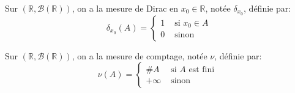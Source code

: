 \begin{example}
	Sur $(\mathbb{R}, \mathscr{B}(\mathbb{R}))$, on a la mesure de
	Dirac en $x_0 \in \mathbb{R}$, notée $\delta_{x_0}$, définie par:
	\begin{equation*}
		\delta_{x_0}(A) = \left\{
		\begin{array}{ll}
			1 & \text{ si } x_0 \in A \\
			0 & \text{ sinon }
		\end{array}
		\right.
	\end{equation*}
\end{example}

\begin{example}
	Sur $(\mathbb{R}, \mathscr{B}(\mathbb{R}))$, on a la mesure de comptage, notée $\nu$, définie par:
	\begin{equation*}
		\nu(A) = \left\{
		\begin{array}{ll}
			\#A     & \text{ si } A \text{ est fini } \\
			+\infty & \text{ sinon }
		\end{array}
		\right.
	\end{equation*}
\end{example}

